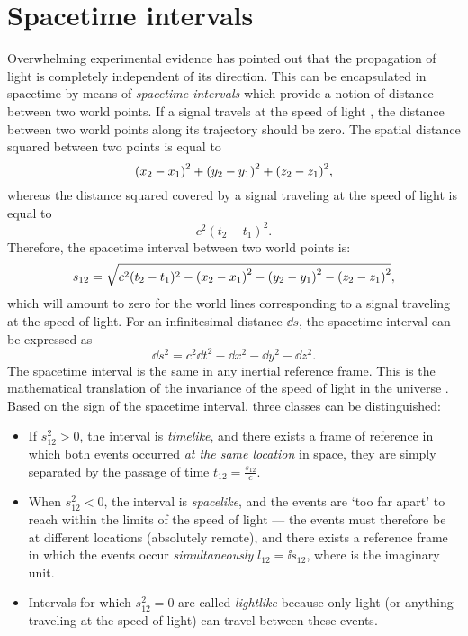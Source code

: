 \section{Spacetime intervals}
\label{sec:spacetime_intervals}
Overwhelming experimental evidence has pointed out that the propagation of light is completely independent of its direction. This can be encapsulated in spacetime by means of \emph{spacetime intervals} which provide a notion of distance between two world points. If a signal travels at the speed of light , the distance between two world points along its trajectory should be zero. The spatial distance squared between two points is equal to
\[
    \qty(x_2 - x_1)^2 + \qty(y_2 - y_1)^2 + \qty(z_2 - z_1)^2,
\]
whereas the distance squared covered by a signal traveling at the speed of light is equal to 
\[c^2(t_2 - t_1)^2. \]
Therefore, the spacetime interval  between two world points is:
\[
    s_{12} = \sqrt{c^2(t_2 - t_1)^2 - \qty(x_2 - x_1)^2 - \qty(y_2 - y_1)^2 - \qty(z_2 - z_1)^2},
\]
which will amount to zero for the world lines corresponding to a signal traveling at the speed of light. For an infinitesimal distance \(\dd{s}\), the spacetime interval can be expressed as
\[ \dd{s}^2 = c^2 \dd{t}^2 - \dd{x}^2 - \dd{y}^2 - \dd{z}^2.\]
The spacetime interval is the same in any inertial reference frame. This is the mathematical translation of the invariance of the speed of light in the universe \cite{Landau1971}. Based on the sign of the spacetime interval, three classes can be distinguished:
\begin{itemize}
    \item If \(s_{12}^2 > 0\), the interval is \emph{timelike}, and there exists a frame of reference in which both events occurred \emph{at the same location} in space, they are simply separated by the passage of time \(\displaystyle t_{12} = \frac{s_{12}}{c}\). 
    \item When \(s_{12}^2 < 0\), the interval is \emph{spacelike}, and the events are `too far apart' to reach within the limits of the speed of light --- the events must therefore be at different locations (absolutely remote), and there exists a reference frame in which the events occur \emph{simultaneously} \(l_{12} = \ii s_{12}\), where  is the imaginary unit.
    \item Intervals for which \(s_{12}^2 = 0\) are called \emph{lightlike} because only light (or anything traveling at the speed of light) can travel between these events.
\end{itemize}
